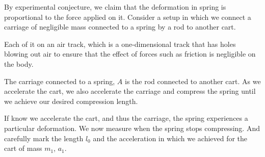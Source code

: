 By experimental conjecture, we claim that the deformation in spring is proportional to the force applied on it.
Consider a setup in which we connect a carriage of negligible mass connected to a spring by a rod to another 
cart. 

Each of it on an air track, which is a one-dimensional track that has holes blowing
out air to ensure that the effect of forces such as friction is negligible on the body.

\begin{marginfigure}
    \centering
    \caption{The carriage connected to a spring, \(A\) is the rod connected to another 
    cart. As we accelerate the cart, we also accelerate the carriage 
    and compress the spring until we achieve our desired compression length.}
\end{marginfigure}

If know we accelerate the cart, and thus the carriage, the spring experiences a particular deformation. We now measure 
when the spring stops compressing. And carefully mark the length \(l_0\) and the
acceleration in which we achieved for the cart of mass \(m_1\), \(a_1\). 

